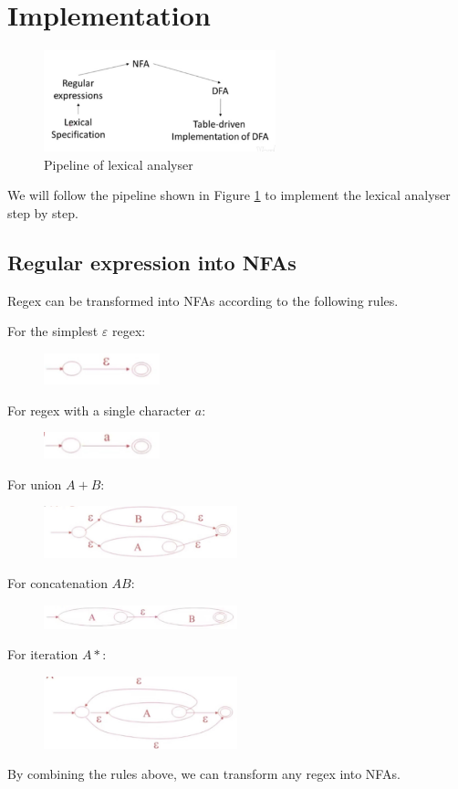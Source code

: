 \section{Implementation}
\begin{figure}[ht]
\centering
\includegraphics[width = 0.6\textwidth]{LApipeline.jpg}
\caption{Pipeline of lexical analyser}\label{pipeline}
\end{figure}
We will follow the pipeline shown in Figure \ref{pipeline} to implement the lexical analyser step by step.
\subsection{Regular expression into NFAs}
Regex can be transformed into NFAs according to the following rules.

For the simplest $\varepsilon$ regex:
\begin{figure}[H]
\centering
\includegraphics[width=0.3\textwidth]{epsilon.jpg}
\end{figure}
For regex with a single character $a$:
\begin{figure}[H]
\centering
\includegraphics[width=0.3\textwidth]{a.jpg}
\end{figure}
For union $A+B$:
\begin{figure}[H]
\centering
\includegraphics[width=0.5\textwidth]{AplusB.jpg}
\end{figure}
For concatenation $AB$:
\begin{figure}[H]
\centering
\includegraphics[width=0.5\textwidth]{AB.jpg}
\end{figure}
For iteration $A*$:
\begin{figure}[H]
\centering
\includegraphics[width=0.5\textwidth]{Astar.jpg}
\end{figure}
By combining the rules above, we can transform any regex into NFAs.
